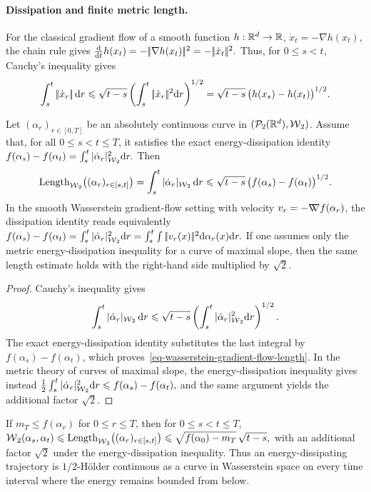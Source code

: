 \paragraph{Dissipation and finite metric length.}
For the classical gradient flow of a smooth function $h:\mathbb{R}^d\to\mathbb{R}$, $\dot x_t=-\nabla h(x_t)$, the chain rule gives \(\frac{\mathrm{d}}{\mathrm{d} t}h(x_t) = -|\!| \nabla h(x_t) |\!|^2 = -|\!| \dot x_t |\!|^2.\)
Thus, for $0\leq s<t$, Cauchy's inequality gives
\begin{equation}\label{eq-euclidean-gradient-flow-length}
\int_s^t |\!| \dot x_r |\!|\,\mathrm{d} r
\leqslant
\sqrt{t-s}\left(\int_s^t|\!| \dot x_r |\!|^2\mathrm{d} r\right)^{1/2}
=
\sqrt{t-s}\,\bigl(h(x_s)-h(x_t)\bigr)^{1/2}.
\end{equation}
\begin{prop}\label{prop-gradient-flow-finite-length}
Let $(\alpha_r)_{r\in[0,T]}$ be an absolutely continuous curve in $(\mathcal{P}_2(\mathbb{R}^d),\operatorname{\mathcal{W}}_2)$. Assume that, for all $0\leq s<t\leq T$, it satisfies the exact energy-dissipation identity
\(f(\alpha_s)-f(\alpha_t) = \int_s^t |\dot\alpha_r|_{\operatorname{\mathcal{W}}_2}^2\mathrm{d} r.\)
Then
\begin{equation}\label{eq-wasserstein-gradient-flow-length}
\operatorname{Length}_{\operatorname{\mathcal{W}}_2}\bigl((\alpha_r)_{r\in[s,t]}\bigr)
=
\int_s^t |\dot\alpha_r|_{\operatorname{\mathcal{W}}_2}\,\mathrm{d} r
\leqslant
\sqrt{t-s}\,\bigl(f(\alpha_s)-f(\alpha_t)\bigr)^{1/2}.
\end{equation}
In the smooth Wasserstein gradient-flow setting with velocity $v_r=-\mathord{\nabla\mkern-9.3mu\nabla} f(\alpha_r)$, the dissipation identity reads equivalently
\(f(\alpha_s)-f(\alpha_t) = \int_s^t |\dot\alpha_r|_{\operatorname{\mathcal{W}}_2}^2\mathrm{d} r = \int_s^t\int |\!| v_r(x) |\!|^2\mathrm{d}\alpha_r(x)\mathrm{d} r.\)
If one assumes only the metric energy-dissipation inequality for a curve of maximal slope, then the same length estimate holds with the right-hand side multiplied by $\sqrt2$.
\end{prop}
\begin{proof}
Cauchy's inequality gives
\[
\int_s^t |\dot\alpha_r|_{\operatorname{\mathcal{W}}_2}\,\mathrm{d} r
\leqslant
\sqrt{t-s}
\left(\int_s^t |\dot\alpha_r|_{\operatorname{\mathcal{W}}_2}^2\mathrm{d} r\right)^{1/2}.
\]
The exact energy-dissipation identity substitutes the last integral by $f(\alpha_s)-f(\alpha_t)$, which proves~\eqref{eq-wasserstein-gradient-flow-length}. In the metric theory of curves of maximal slope, the energy-dissipation inequality gives instead
\(\frac12\int_s^t |\dot\alpha_r|_{\operatorname{\mathcal{W}}_2}^2\mathrm{d} r \leqslant f(\alpha_s)-f(\alpha_t),\)
and the same argument yields the additional factor $\sqrt2$.
\end{proof}
If \(m_T\leq f(\alpha_r)\) for \(0\leq r\leq T\), then for \(0\leq s<t\leq T\), \(\operatorname{\mathcal{W}}_2(\alpha_s,\alpha_t) \leqslant \operatorname{Length}_{\operatorname{\mathcal{W}}_2}\bigl((\alpha_r)_{r\in[s,t]}\bigr) \leqslant \sqrt{f(\alpha_0)-m_T}\,\sqrt{t-s},\)
with an additional factor \(\sqrt2\) under the energy-dissipation inequality. Thus an energy-dissipating trajectory is \(1/2\)-H\"older continuous as a curve in Wasserstein space on every time interval where the energy remains bounded from below.


